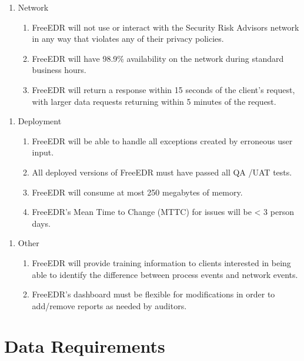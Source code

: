 \documentclass{scrreprt}
\begin{document}
\begin{enumerate}[resume*]
    \item Network
    \begin{enumerate}[label*=\arabic*.]
\item FreeEDR will not use or interact with the Security Risk Advisors network in any way that violates any of their privacy policies. 
\item FreeEDR will have 98.9\% availability on the network during standard business hours.
\item FreeEDR will return a response within 15 seconds of the client’s request, with larger data requests returning within 5 minutes of the request.

    \end{enumerate}
\end{enumerate}

\begin{enumerate}[resume*]
    \item Deployment
    \begin{enumerate}[label*=\arabic*.]
\item FreeEDR will be able to handle all exceptions created by erroneous user input. 
\item All deployed versions of FreeEDR must have passed all QA /UAT tests.
\item FreeEDR will consume at most 250 megabytes of memory.
\item FreeEDR’s Mean Time to Change (MTTC) for issues will be < 3 person days. 

    \end{enumerate}
\end{enumerate}

\begin{enumerate}[resume*]
    \item Other
    \begin{enumerate}[label*=\arabic*.]
\item FreeEDR will provide training information to clients interested in being able to identify the difference between process events and network events.
\item FreeEDR’s dashboard must be flexible for modifications in order to add/remove reports as needed by auditors.
    \end{enumerate}
\end{enumerate}


\section{Data Requirements}
\end{document}
